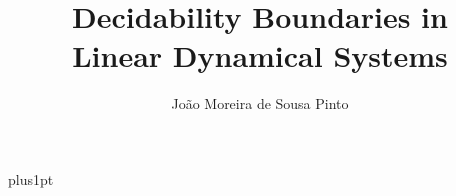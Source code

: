 \documentclass[12pt]{ociamthesis}
\title{Decidability Boundaries in\\[1ex] Linear Dynamical Systems}
\author{Jo\~{a}o Moreira de Sousa Pinto}
\begin{document}
\baselineskip=18pt plus1pt

\setcounter{secnumdepth}{3}
\setcounter{tocdepth}{3}

\maketitle                  %

\begin{romanpages}          %
\tableofcontents            %
\listoffigures              %
\end{romanpages}            %

%
%
%

%
%

\end{document}
